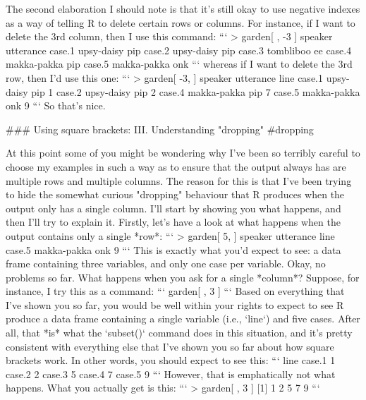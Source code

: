 The second elaboration I should note is that it's still okay to use negative indexes as a way of telling R to delete certain rows or columns. For instance, if I want to delete the 3rd column, then I use this command:
```
> garden[ , -3 ]
           speaker utterance
case.1  upsy-daisy       pip
case.2  upsy-daisy       pip
case.3   tombliboo        ee
case.4 makka-pakka       pip
case.5 makka-pakka       onk
```
whereas if I want to delete the 3rd row, then I'd use this one:
```
> garden[ -3,  ]
           speaker utterance line
case.1  upsy-daisy       pip    1
case.2  upsy-daisy       pip    2
case.4 makka-pakka       pip    7
case.5 makka-pakka       onk    9
```
So that's nice.


### Using square brackets: III. Understanding "dropping" {#dropping}

At this point some of you might be wondering why I've been so terribly careful to choose my examples in such a way as to ensure that the output always has are multiple rows and multiple columns. The reason for this is that I've been trying to hide the somewhat curious "dropping" behaviour that R produces when the output only has a single column. I'll start by showing you what happens, and then I'll try to explain it. Firstly, let's have a look at what happens when the output contains only a single *row*:
```
> garden[ 5, ]
           speaker utterance line
case.5 makka-pakka       onk    9
```
This is exactly what you'd expect to see: a data frame containing three variables, and only one case per variable. Okay, no problems so far. What happens when you ask for a single *column*? Suppose, for instance, I try this as a command:
```
garden[ , 3 ]
```
Based on everything that I've shown you so far, you would be well within your rights to expect to see R produce a data frame containing a single variable (i.e., `line`) and five cases. After all, that *is* what the `subset()` command does in this situation, and it's pretty consistent with everything else that I've shown you so far about how square brackets work. In other words, you should expect to see this:
```
       line
case.1    1
case.2    2
case.3    5
case.4    7
case.5    9
```
However, that is emphatically not what happens. What you actually get is this:
```
> garden[ , 3 ]
[1] 1 2 5 7 9
```
